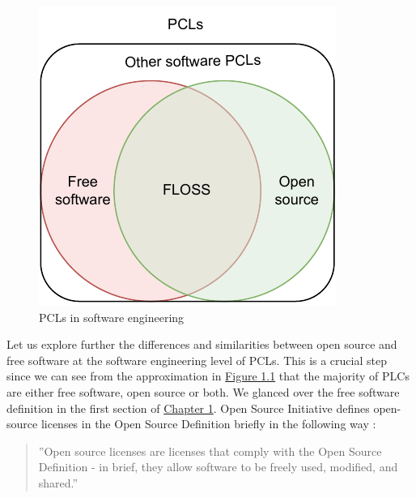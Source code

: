 \begin{figure}[t]
	\centering
	\includegraphics[scale=1.5]{figures/terms-diagram.pdf}
	\caption{PCLs in software engineering}
	\label{fig:terms}
\end{figure}

Let us explore further the differences and similarities between open source and free software at the software engineering level of PCLs. This is a crucial step since we can see from the approximation in \hyperref[fig:terms]{Figure 1.1} that the majority of PLCs are either free software, open source or both. We glanced over the free software definition in the first section of \hyperref[intro]{Chapter 1}. Open Source Initiative defines open-source licenses in the Open Source Definition briefly in the following way \citep{osi:licenselist}:
\begin{quote}
	''Open source licenses are licenses that comply with the Open Source Definition - in brief, they allow software to be freely used, modified, and shared.''
\end{quote}

